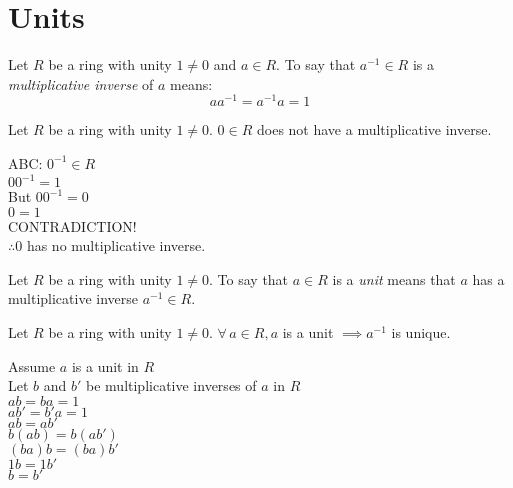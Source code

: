 \documentclass[letterpaper,12pt,fleqn]{article}
\begin{document}
\section*{Units}

\begin{definition}
  Let $R$ be a ring with unity $1\ne0$ and $a\in R$. To say that $a^{-1}\in R$
  is a \emph{multiplicative inverse} of $a$ means:
  \[aa^{-1}=a^{-1}a=1\]
\end{definition}

\begin{theorem}
  Let $R$ be a ring with unity $1\ne0$. $0\in R$ does not have a multiplicative
  inverse.
\end{theorem}

\begin{theproof}
  ABC: $0^{-1}\in R$ \\
  $00^{-1}=1$ \\
  But $00^{-1}=0$ \\
  $0=1$ \\
  CONTRADICTION! \\
  $\therefore 0$ has no multiplicative inverse.
\end{theproof}

\begin{definition}
  Let $R$ be a ring with unity $1\ne0$. To say that $a\in R$ is a \emph{unit}
  means that $a$ has a multiplicative inverse $a^{-1}\in R$.
\end{definition}

\begin{theorem}
  Let $R$ be a ring with unity $1\ne0$. $\forall\,a\in R, a$ is a unit
  $\implies a^{-1}$ is unique.
\end{theorem}

\begin{theproof}
  Assume $a$ is a unit in $R$ \\
  Let $b$ and $b'$ be multiplicative inverses of $a$ in $R$ \\
  $ab=ba=1$ \\
  $ab'=b'a=1$ \\
  $ab=ab'$ \\
  $b(ab)=b(ab')$ \\
  $(ba)b=(ba)b'$ \\
  $1b=1b'$ \\
  $b=b'$
\end{theproof}
\end{document}
